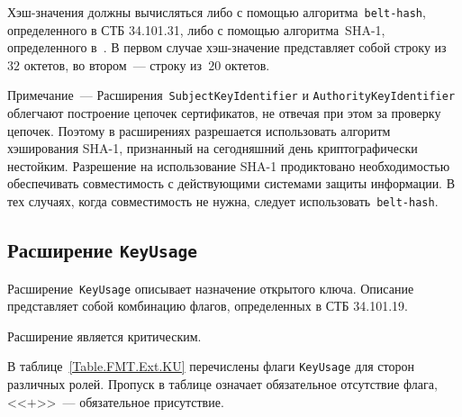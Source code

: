Хэш-значения должны вычисляться либо с помощью алгоритма~\texttt{belt-hash}, 
определенного в СТБ 34.101.31, либо с помощью алгоритма~SHA-1,
определенного в~\cite{SHA1}. В первом случае хэш-значение 
представляет собой строку из~$32$ октетов, во втором~--- 
строку из~$20$ октетов.

\begin{note}
Примечание~--- 
Расширения~\texttt{SubjectKeyIdentifier} и \texttt{AuthorityKeyIdentifier}
облегчают построение цепочек сертификатов, не отвечая при этом за проверку 
цепочек. Поэтому в расширениях разрешается использовать алгоритм хэширования
SHA-1, признанный на сегодняшний день криптографически нестойким.
Разрешение на использование SHA-1  продиктовано необходимостью 
обеспечивать совместимость с действующими системами защиты информации. 
В тех случаях, когда совместимость не нужна, следует 
использовать~\texttt{belt-hash}.
\end{note}

\subsection{Расширение \texttt{KeyUsage}}\label{FMT.Ext.KU}

Расширение~\texttt{KeyUsage} описывает назначение открытого ключа. 
Описание представляет собой комбинацию флагов, определенных в СТБ 34.101.19.

Расширение является критическим.

В таблице~\ref{Table.FMT.Ext.KU} перечислены флаги \texttt{KeyUsage} 
для сторон различных ролей. 
%
Пропуск в таблице означает обязательное отсутствие флага,
<<$+$>>~--- обязательное присутствие.

